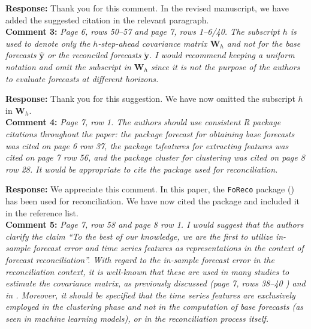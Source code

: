 \documentclass{article}
\numberwithin{equation}{section}
\theoremstyle{plain}
\theoremstyle{definition}
\theoremstyle{remark}
\let\code=\texttt
\begin{document}
\medskip
\noindent \textbf{Response:} {Thank you for this comment. In the revised manuscript, we have added the suggested citation in the relevant paragraph. } \\


\textbf{Comment 3:} \textit{Page 6, rows 50--57 and page 7, rows 1--6/40. The subscript $h$ is used to denote only the $h$-step-ahead covariance matrix $\boldsymbol{W}_h$ and not for the base forecasts $\hat{\boldsymbol{y}}$ or the reconciled forecasts $\tilde{\boldsymbol{y}}$. I would recommend keeping a uniform notation and omit the subscript in $\boldsymbol{W}_h$ since it is not the purpose of the authors to evaluate forecasts at different horizons.}


\medskip

\noindent \textbf{Response:} {Thank you for this suggestion. We have now omitted the subscript $h$ in $\boldsymbol{W}_h$.}\\


\textbf{Comment 4:} \textit{Page 7, row 1. The authors should use consistent R package citations throughout the paper: the package forecast for obtaining base forecasts was cited on page 6 row 37, the package tsfeatures for extracting features was cited on page 7 row 56, and the package cluster for clustering was cited on page 8 row 28. It would be appropriate to cite the package used for reconciliation.} 

\medskip

\noindent \textbf{Response:}  {We appreciate this comment. In this paper, the \code{FoReco} package (\citealp{FoReco}) has been used for reconciliation. We have now cited the package and included it in the reference list. } \\


\textbf{Comment 5:} \textit{Page 7, row 58 and page 8 row 1. I would suggest that the authors clarify the claim ``To the best of our knowledge, we are the first to utilize in-sample forecast error and time series features as representations in the context of forecast reconciliation''. With regard to the in-sample forecast error in the reconciliation context, it is well-known that these are used in many studies to estimate the covariance matrix, as previously discussed (page 7, rows 38--40 ) and in \cite{wickramasuriyaOptimalForecastReconciliation2019}. Moreover, it should be specified that the time series features are exclusively employed in the clustering phase and not in the computation of base forecasts (as seen in machine learning models), or in the reconciliation process itself.}
\end{document}
